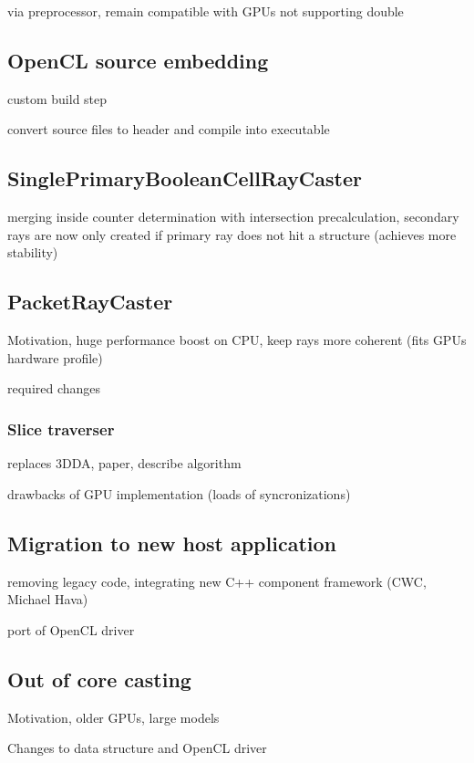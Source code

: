 via preprocessor, remain compatible with GPUs not supporting double

\subsection{OpenCL source embedding}

custom build step

convert source files to header and compile into executable

\subsection{SinglePrimaryBooleanCellRayCaster}

merging inside counter determination with intersection precalculation, secondary rays are now only created if primary ray does not hit a structure (achieves more stability)

\subsection{PacketRayCaster}

Motivation, huge performance boost on CPU, keep rays more coherent (fits GPUs hardware profile)

required changes

\subsubsection{Slice traverser}

replaces 3DDA, paper, describe algorithm

drawbacks of GPU implementation (loads of syncronizations)

\subsection{Migration to new host application}
\label{sec:migration}

removing legacy code, integrating new C++ component framework (CWC, Michael Hava)

port of OpenCL driver

\subsection{Out of core casting}

Motivation, older GPUs, large models

Changes to data structure and OpenCL driver

